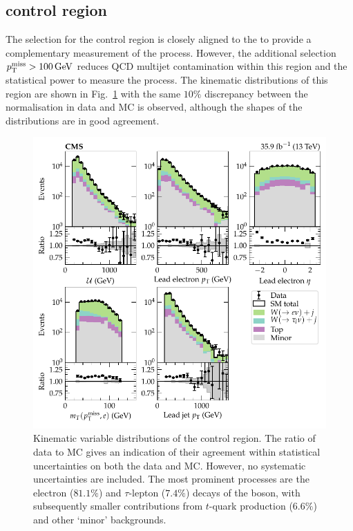 \subsection{\eleplusjets control region}

The selection for the \eleplusjets control region is closely aligned to the \muplusjets to
provide a complementary measurement of the \IWlvj process. However, the
additional selection ${p_{\text{T}}^{\mathrm{miss}}>\SI{100}{GeV}}$ reduces QCD multijet
contamination within this region and the statistical power to measure the
\IWlvj process. The kinematic distributions of this region are shown in
Fig.~\ref{fig:eleplusjets} with the same $10\%$ discrepancy between the
normalisation in data and MC is observed, although the shapes of the distributions are in good agreement. 
%
\begin{figure}[htb]
    \centering
    \includegraphics{chapters/042_backgrounds/images/singleele_dists.pdf}
    \caption[Single electron final state kinematics.]{
        Kinematic variable distributions of the \eleplusjets control region. The ratio of data to MC gives an indication of their agreement within statistical uncertainties on both the data and MC. However, no systematic uncertainties are included. The most prominent processes are the electron ($81.1\%$) and $\tau$-lepton ($7.4\%$) decays of the \PW boson, with subsequently smaller contributions from $t$-quark production ($6.6\%$) and other `minor' backgrounds.
    }
    \label{fig:eleplusjets}
\end{figure}
